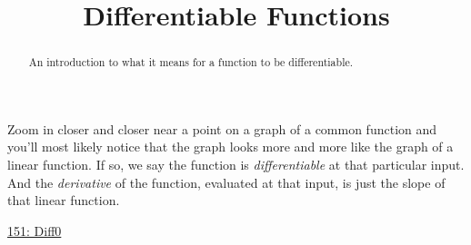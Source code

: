 \documentclass{ximera}
\title{Differentiable Functions}
\begin{document}
\begin{abstract}
An introduction to what it means for a function to be differentiable.
\end{abstract}
\maketitle

Zoom in closer and closer near a point on a graph of a common function and you'll most likely notice that the graph looks more and more like the graph of a linear function. If so, we say the function is \emph{differentiable} at that particular input. And the \emph{derivative} of the function, evaluated at that input, is just the slope of that linear function.

\begin{onlineOnly}
    \begin{center}
\end{center}
\end{onlineOnly}

\href{https://www.desmos.com/calculator/y8drfaptrc}{151: Diff0}
\end{document}
